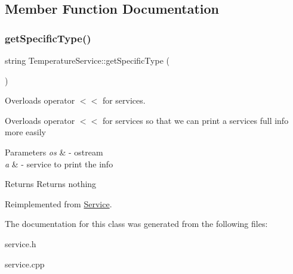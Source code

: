 \subsection{Member Function Documentation}
\mbox{\label{class_temperature_service_afe119e9c22598d454c7355a49f984df5}} 
\subsubsection{\texorpdfstring{get\+Specific\+Type()}{getSpecificType()}}
{\footnotesize\ttfamily string Temperature\+Service\+::get\+Specific\+Type (\begin{DoxyParamCaption}{ }\end{DoxyParamCaption})\hspace{0.3cm}{\ttfamily [virtual]}}



Overloads operator $<$$<$ for services. 

Overloads operator $<$$<$ for services so that we can print a service\textquotesingle{}s full info more easily


\begin{DoxyParams}{Parameters}
{\em os} & -\/ ostream \\
\hline
{\em a} & -\/ service to \textquotesingle{}print\textquotesingle{} the info \\
\hline
\end{DoxyParams}
\begin{DoxyReturn}{Returns}
Returns nothing 
\end{DoxyReturn}


Reimplemented from \hyperlink{class_service_a4e833f8d8688facfe0858eb4299660e8}{Service}.



The documentation for this class was generated from the following files\+:\begin{DoxyCompactItemize}
\item 
service.\+h\item 
service.\+cpp\end{DoxyCompactItemize}
